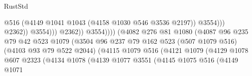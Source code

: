 \begin{lexlean}{RustStd}
\begin{coremodule}
                                                                @516
                                                                (@4149
                                                                  @1041
                                                                  @1043
                                                                  (@4158 @1030 @546 @3536 @2197))
                                                                @3554)))
                                                          @2362))
                                                      @3554)))
                                                @2362))
                                            @3554))))
                                    (@4082
                                      @276
                                      @81
                                      @1080
                                      (@4087
                                        @96
                                        @235
                                        @79
                                        @42
                                        @523
                                        @1079
                                        (@3504
                                          @96
                                          @237
                                          @79
                                          @162
                                          @523
                                          (@507 @1079 @516)
                                          (@4103 @93 @79 @522 @2044)
                                          (@4115
                                            @1079
                                            @516
                                            (@4121
                                              @1079
                                              (@4129
                                                @1078
                                                @607
                                                @2323
                                                (@4134
                                                  @1078
                                                  (@4139
                                                    @1077
                                                    @3551
                                                    (@4145
                                                      @1075
                                                      @516
                                                      (@4149
                                                        @1071

\end{coremodule}
\end{lexlean}
